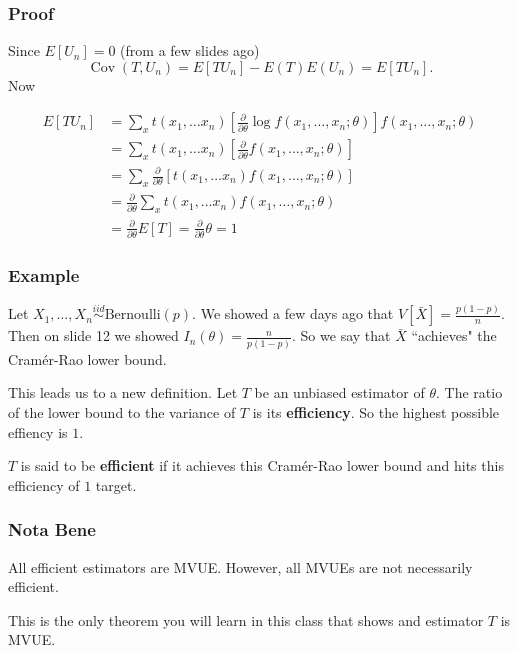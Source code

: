\documentclass{beamer}
\begin{document}
\begin{frame}
\frametitle{Proof}

Since $E[U_n] = 0$ (from a few slides ago)
\[
\operatorname{Cov}(T,U_n) = E[TU_n] -E(T)E(U_n) = E[TU_n].
\]
Now

\begin{align*}
E[TU_n] &= \sum_x t(x_1, \ldots x_n) \left[ \frac{\partial}{\partial \theta} \log f(x_1, \ldots, x_n;\theta) \right]f(x_1, \ldots, x_n;\theta) \\
&= \sum_x t(x_1, \ldots x_n) \left[ \frac{\partial}{\partial \theta} f(x_1, \ldots, x_n;\theta) \right]\\
&= \sum_x \frac{\partial}{\partial \theta} \left[ t(x_1, \ldots x_n)  f(x_1, \ldots, x_n;\theta)\right] \\
&= \frac{\partial}{\partial \theta} \sum_x  t(x_1, \ldots x_n)  f(x_1, \ldots, x_n;\theta) \\
&= \frac{\partial}{\partial \theta} E[T] = \frac{\partial}{\partial \theta} \theta = 1
\end{align*}


\end{frame}


\begin{frame}
\frametitle{Example}

Let $X_1, \ldots, X_n \overset{iid}{\sim} \text{Bernoulli}(p)$. We showed a few days ago that $V[\bar{X}] = \frac{p(1-p)}{n}$. Then on slide 12 we showed $I_n(\theta) = \frac{n}{p(1-p)}$. So we say that $\bar{X}$ ``achieves" the Cram\'er-Rao lower bound. 
\newline
\pause

This leads us to a new definition. Let $T$ be an unbiased estimator of $\theta$. The ratio of the lower bound to the variance of $T$ is its \textbf{efficiency}. So the highest possible effiency is $1$. 
\newline

$T$ is said to be \textbf{efficient} if it achieves this Cram\'er-Rao lower bound and hits this efficiency of $1$ target. 
\newline

\end{frame}




\begin{frame}
\frametitle{Nota Bene}

All efficient estimators are MVUE. However, all MVUEs are not necessarily efficient.
\newline

This is the only theorem you will learn in this class that shows and estimator $T$ is MVUE.

\end{frame}
\end{document}

